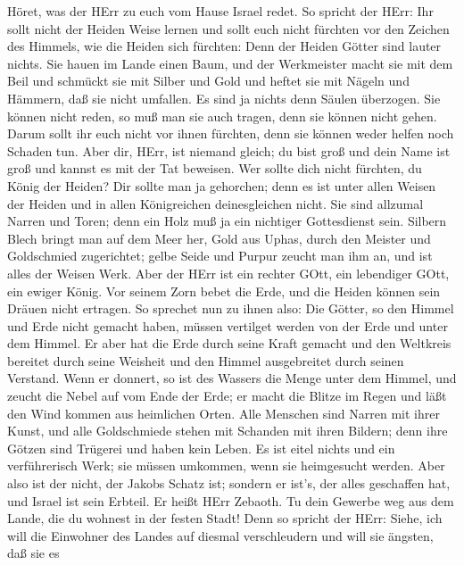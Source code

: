  Höret, was der HErr zu euch vom Hause Israel redet.
 So spricht der HErr: Ihr sollt nicht der Heiden Weise
lernen und sollt euch nicht fürchten vor den Zeichen des Himmels, wie
die Heiden sich fürchten:  Denn der Heiden Götter sind
lauter nichts. Sie hauen im Lande einen Baum, und der Werkmeister macht
sie mit dem Beil  und schmückt sie mit Silber und Gold und
heftet sie mit Nägeln und Hämmern, daß sie nicht umfallen. 
Es sind ja nichts denn Säulen überzogen. Sie können nicht reden, so muß
man sie auch tragen, denn sie können nicht gehen. Darum sollt ihr euch
nicht vor ihnen fürchten, denn sie können weder helfen noch Schaden tun.
 Aber dir, HErr, ist niemand gleich; du bist groß und dein
Name ist groß und kannst es mit der Tat beweisen.  Wer
sollte dich nicht fürchten, du König der Heiden? Dir sollte man ja
gehorchen; denn es ist unter allen Weisen der Heiden und in allen
Königreichen deinesgleichen nicht.  Sie sind allzumal Narren
und Toren; denn ein Holz muß ja ein nichtiger Gottesdienst sein.
 Silbern Blech bringt man auf dem Meer her, Gold aus Uphas,
durch den Meister und Goldschmied zugerichtet; gelbe Seide und Purpur
zeucht man ihm an, und ist alles der Weisen Werk.  Aber der
HErr ist ein rechter GOtt, ein lebendiger GOtt, ein ewiger König. Vor
seinem Zorn bebet die Erde, und die Heiden können sein Dräuen nicht
ertragen.  So sprechet nun zu ihnen also: Die Götter, so
den Himmel und Erde nicht gemacht haben, müssen vertilget werden von der
Erde und unter dem Himmel.  Er aber hat die Erde durch
seine Kraft gemacht und den Weltkreis bereitet durch seine Weisheit und
den Himmel ausgebreitet durch seinen Verstand.  Wenn er
donnert, so ist des Wassers die Menge unter dem Himmel, und zeucht die
Nebel auf vom Ende der Erde; er macht die Blitze im Regen und läßt den
Wind kommen aus heimlichen Orten.  Alle Menschen sind
Narren mit ihrer Kunst, und alle Goldschmiede stehen mit Schanden mit
ihren Bildern; denn ihre Götzen sind Trügerei und haben kein Leben.
 Es ist eitel nichts und ein verführerisch Werk; sie müssen
umkommen, wenn sie heimgesucht werden.  Aber also ist der
nicht, der Jakobs Schatz ist; sondern er ist's, der alles geschaffen
hat, und Israel ist sein Erbteil. Er heißt HErr Zebaoth. 
Tu dein Gewerbe weg aus dem Lande, die du wohnest in der festen Stadt!
 Denn so spricht der HErr: Siehe, ich will die Einwohner
des Landes auf diesmal verschleudern und will sie ängsten, daß sie es
